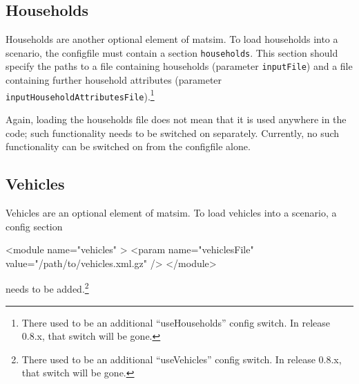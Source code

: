 \subsection{Households}
\label{sec:extending-households}
Households are another optional element of \gls{matsim}. To load households into a scenario, the %
\gls{configfile} must 
contain a section \lstinline|households|. This section should specify the paths to a file containing households (parameter \lstinline|inputFile|) and a file containing further household attributes (parameter \lstinline|inputHouseholdAttributesFile|).\footnote{%
%
There used to be an additional ``useHouseholds'' config switch.  In release 0.8.x, that switch will be gone.
%
}

Again, loading the households file does not mean that it is used anywhere in the code; such functionality needs to be switched on separately.  Currently, no such functionality can be switched on from the \gls{configfile} alone.



\subsection{Vehicles}
\label{sec:extending-vehicles}

Vehicles are an optional element of \gls{matsim}. To load vehicles into a scenario, a config section
\begin{xml}
<module name="vehicles" >
   <param name="vehiclesFile" value="/path/to/vehicles.xml.gz" />
</module>
\end{xml}
needs to be added.\footnote{%
%
There used to be an additional ``useVehicles'' config switch.  In release 0.8.x, that switch will be gone.
%
}

